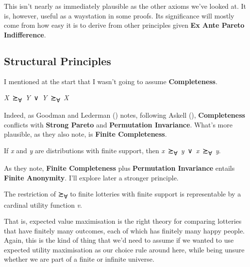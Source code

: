 \documentclass[
  11pt,
  letterpaper,
  DIV=11,
  numbers=noendperiod,
  twoside]{scrartcl}
\providecommand{\tightlist}{%
  \setlength{\itemsep}{0pt}\setlength{\parskip}{0pt}}
\begin{document}
This isn't nearly as immediately plausible as the other axioms we've
looked at. It is, however, useful as a waystation in some proofs. Its
significance will mostly come from how easy it is to derive from other
principles given \textbf{Ex Ante Pareto Indifference}.

\subsection{Structural Principles}\label{structural-principles}

I mentioned at the start that I wasn't going to assume
\textbf{Completeness}.

\begin{description}
\tightlist
\item[Completeness]
\emph{X}~≿\textsubscript{∀}~\emph{Y}~∨~\emph{Y}~≿\textsubscript{∀}~\emph{X}
\end{description}

Indeed, as Goodman and Lederman
() notes, following Askell
(), \textbf{Completeness} conflicts with
\textbf{Strong Pareto} and \textbf{Permutation Invariance}. What's more
plausible, as they also note, is \textbf{Finite Completeness}.

\begin{description}
\tightlist
\item[Finite Completeness]
If \emph{x} and \emph{y} are distributions with finite support, then
\emph{x}~≿\textsubscript{∀}~\emph{y}~∨~\emph{x}~≿\textsubscript{∀}~\emph{y}.
\end{description}

As they note, \textbf{Finite Completeness} plus \textbf{Permutation
Invariance} entails \textbf{Finite Anonymity}. I'll explore later a
stronger principle.

\begin{description}
\tightlist
\item[Finite Evaluability]
The restriction of ≿\textsubscript{∀} to finite lotteries with finite
support is representable by a cardinal utility function \emph{v}.
\end{description}

That is, expected value maximisation is the right theory for comparing
lotteries that have finitely many outcomes, each of which has finitely
many happy people. Again, this is the kind of thing that we'd need to
assume if we wanted to use expected utility maximisation as our choice
rule around here, while being unsure whether we are part of a finite or
infinite universe.
\end{document}
